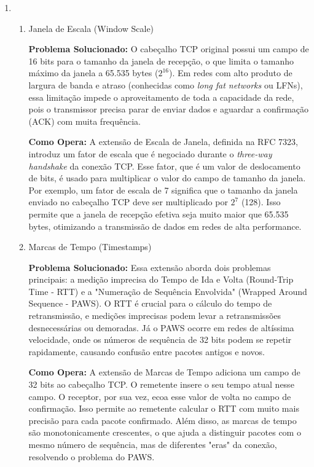 \begin{enumerate}[label=\alph*.]
    \item \begin{enumerate}[label=\roman*.]
        \item{Janela de Escala (Window Scale)}

\textbf{Problema Solucionado:} O cabeçalho TCP original possui um campo de 16 bits para o tamanho da janela de recepção, o que limita o tamanho máximo da janela a 65.535 bytes ($2^{16}$). Em redes com alto produto de largura de banda e atraso (conhecidas como \textit{long fat networks} ou LFNs), essa limitação impede o aproveitamento de toda a capacidade da rede, pois o transmissor precisa parar de enviar dados e aguardar a confirmação (ACK) com muita frequência.

\vspace{1em}

\textbf{Como Opera:} A extensão de Escala de Janela, definida na RFC 7323, introduz um fator de escala que é negociado durante o \textit{three-way handshake} da conexão TCP. Esse fator, que é um valor de deslocamento de bits, é usado para multiplicar o valor do campo de tamanho da janela. Por exemplo, um fator de escala de 7 significa que o tamanho da janela enviado no cabeçalho TCP deve ser multiplicado por $2^7$ (128). Isso permite que a janela de recepção efetiva seja muito maior que 65.535 bytes, otimizando a transmissão de dados em redes de alta performance.


\item{Marcas de Tempo (Timestamps)}

\textbf{Problema Solucionado:} Essa extensão aborda dois problemas principais: a medição imprecisa do Tempo de Ida e Volta (Round-Trip Time - RTT) e a "Numeração de Sequência Envolvida" (Wrapped Around Sequence - PAWS). O RTT é crucial para o cálculo do tempo de retransmissão, e medições imprecisas podem levar a retransmissões desnecessárias ou demoradas. Já o PAWS ocorre em redes de altíssima velocidade, onde os números de sequência de 32 bits podem se repetir rapidamente, causando confusão entre pacotes antigos e novos.

\vspace{1em}

\textbf{Como Opera:} A extensão de Marcas de Tempo adiciona um campo de 32 bits ao cabeçalho TCP. O remetente insere o seu tempo atual nesse campo. O receptor, por sua vez, ecoa esse valor de volta no campo de confirmação. Isso permite ao remetente calcular o RTT com muito mais precisão para cada pacote confirmado. Além disso, as marcas de tempo são monotonicamente crescentes, o que ajuda a distinguir pacotes com o mesmo número de sequência, mas de diferentes "eras" da conexão, resolvendo o problema do PAWS.



\end{enumerate}
\end{enumerate}
